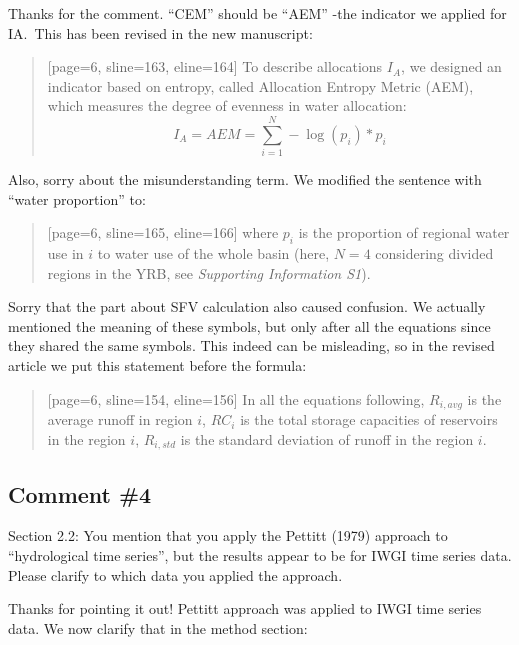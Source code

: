 \AR{} Thanks for the comment. ``CEM'' should be ``AEM'' -the indicator we applied for IA.\ This has been revised in the new manuscript:

\begin{quote}[page=6, sline=163, eline=164]
    To describe allocations $I_A$, we designed an indicator based on entropy, called Allocation Entropy Metric (AEM), which measures the degree of evenness in water allocation:
    \[I_A = AEM = \sum_{i=1}^N - \log(p_{i}) * p_{i}\]
\end{quote}

\AR*{} Also, sorry about the misunderstanding term. We modified the sentence with ``water proportion'' to:

\begin{quote}[page=6, sline=165, eline=166]
    where $p_{i}$ is the proportion of regional water use in $i$ to water use of the whole basin (here, $N=4$ considering divided regions in the YRB, see \textit{Supporting Information S1}).
\end{quote}

\AR*{} Sorry that the part about SFV calculation also caused confusion. We actually mentioned the meaning of these symbols, but only after all the equations since they shared the same symbols. This indeed can be misleading, so in the revised article we put this statement before the formula:

\begin{quote}[page=6, sline=154, eline=156]
    In all the equations following, $R_{i, avg}$ is the average runoff in region $i$, $RC_i$ is the total storage capacities of reservoirs in the region $i$, $R_{i, std}$ is the standard deviation of runoff in the region $i$.
\end{quote}

\subsection{Comment \#4}
\RC{} Section 2.2: You mention that you apply the Pettitt (1979) approach to ``hydrological time series'', but the results appear to be for IWGI time series data. Please clarify to which data you applied the approach.

\AR{} Thanks for pointing it out! Pettitt approach was applied to IWGI time series data. We now clarify that in the method section:

